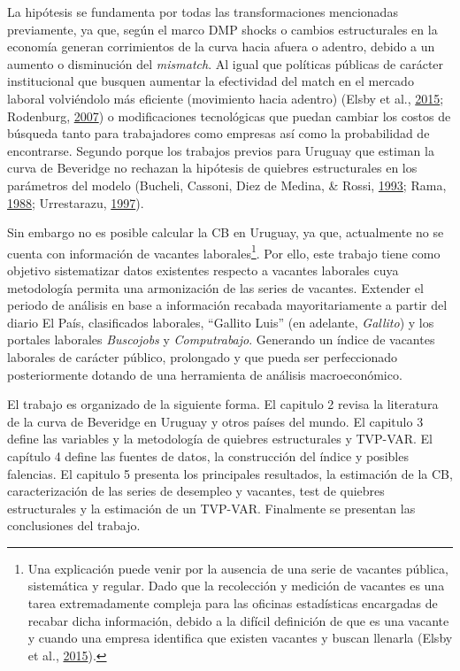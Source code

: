 \documentclass[12pt,oneside]{reedthesis}
\begin{document}
La hipótesis se fundamenta por todas las transformaciones mencionadas previamente, ya que, según el marco DMP shocks o cambios estructurales en la economía generan corrimientos de la curva hacia afuera o adentro, debido a un aumento o disminución del \emph{mismatch}. Al igual que políticas públicas de carácter institucional que busquen aumentar la efectividad del match en el mercado laboral volviéndolo más eficiente (movimiento hacia adentro) (Elsby et al., \protect\hyperlink{ref-Elsby2015}{2015}; Rodenburg, \protect\hyperlink{ref-Rodenburg2007}{2007}) o modificaciones tecnológicas que puedan cambiar los costos de búsqueda tanto para trabajadores como empresas así como la probabilidad de encontrarse. Segundo porque los trabajos previos para Uruguay que estiman la curva de Beveridge no rechazan la hipótesis de quiebres estructurales en los parámetros del modelo (Bucheli, Cassoni, Diez de Medina, \& Rossi, \protect\hyperlink{ref-DECON1993}{1993}; Rama, \protect\hyperlink{ref-Rama1988}{1988}; Urrestarazu, \protect\hyperlink{ref-Urrestarazu1997}{1997}).

Sin embargo no es posible calcular la CB en Uruguay, ya que, actualmente no se cuenta con información de vacantes laborales\footnote{Una explicación puede venir por la ausencia de una serie de vacantes pública, sistemática y regular. Dado que la recolección y medición de vacantes es una tarea extremadamente compleja para las oficinas estadísticas encargadas de recabar dicha información, debido a la difícil definición de que es una vacante y cuando una empresa identifica que existen vacantes y buscan llenarla (Elsby et al., \protect\hyperlink{ref-Elsby2015}{2015}).}. Por ello, este trabajo tiene como objetivo sistematizar datos existentes respecto a vacantes laborales cuya metodología permita una armonización de las series de vacantes. Extender el periodo de análisis en base a información recabada mayoritariamente a partir del diario El País, clasificados laborales, ``Gallito Luis'' (en adelante, \emph{Gallito}) y los portales laborales \emph{Buscojobs} y \emph{Computrabajo}. Generando un índice de vacantes laborales de carácter público, prolongado y que pueda ser perfeccionado posteriormente dotando de una herramienta de análisis macroeconómico.

El trabajo es organizado de la siguiente forma. El capitulo 2 revisa la literatura de la curva de Beveridge en Uruguay y otros países del mundo. El capitulo 3 define las variables y la metodología de quiebres estructurales y TVP-VAR. El capítulo 4 define las fuentes de datos, la construcción del índice y posibles falencias. El capitulo 5 presenta los principales resultados, la estimación de la CB, caracterización de las series de desempleo y vacantes, test de quiebres estructurales y la estimación de un TVP-VAR. Finalmente se presentan las conclusiones del trabajo.
\end{document}
